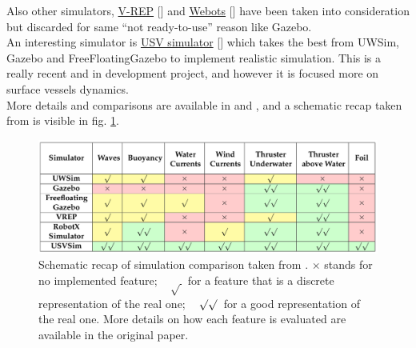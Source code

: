 Also other simulators, \href{http://www.coppeliarobotics.com/index.html}{V-REP} [\cite{vrep}] and \href{https://cyberbotics.com/}{Webots} [\cite{webots}] have been taken into consideration but discarded for same \enquote{not ready-to-use} reason like Gazebo.\\
An interesting simulator is \href{https://github.com/disaster-robotics-proalertas/usv_sim_lsa}{USV simulator} [\cite{usvsim}] which takes the best from UWSim, Gazebo and FreeFloatingGazebo to implement realistic simulation. This is a really recent and in development project, and however it is focused more on surface vessels dynamics.\\

More details and comparisons are available in \cite{simComparisonCook} and \cite{usvsim}, and a schematic recap taken from \cite{usvsim} is visible in fig. \ref{fig:simComparison}.
\begin{figure}[H]
	\centering
	\includegraphics[width=14cm]{simComparison.png}
	\caption[Schematic Simulators Comparison]{Schematic recap of simulation comparison taken from \cite{usvsim}. $\times$ stands for no implemented feature; ~ $\surd\,$  for a feature that is a discrete representation of the real one; ~ $\surd\surd\,$ for a good representation of the real one. More details on how each feature is evaluated are available in the original paper.}
	\label{fig:simComparison}
\end{figure}


